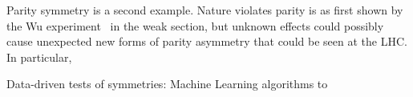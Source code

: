 Parity symmetry is a second example. Nature violates parity is as first shown
by the Wu experiment~\cite{PhysRev.105.1413} in the weak section, but unknown
effects could possibly cause unexpected new forms of parity asymmetry that
could be seen at the LHC. In particular, \TODO{}


Data-driven tests of symmetries:
Machine Learning algorithms to ~\cite{lester2021stressed}
~\cite{Lester:2019bso}
~\cite{tombs2021which}
~\cite{lester2022hunting}


